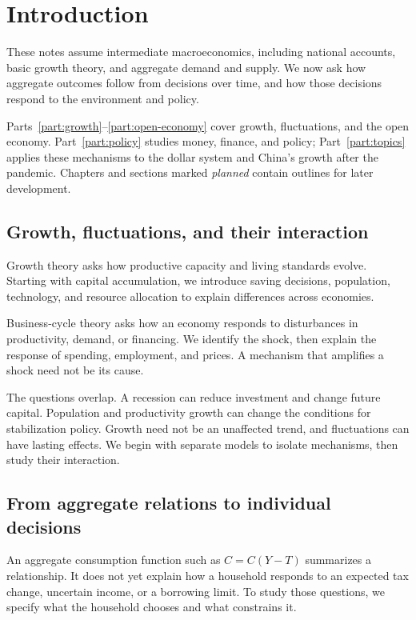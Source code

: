 \section{Introduction}\label{sec:introduction}

These notes assume intermediate macroeconomics, including national accounts,
basic growth theory, and aggregate demand and supply. We now ask how aggregate
outcomes follow from decisions over time, and how those decisions respond to
the environment and policy.

Parts~\ref{part:growth}--\ref{part:open-economy} cover growth, fluctuations,
and the open economy. Part~\ref{part:policy} studies money, finance, and policy;
Part~\ref{part:topics} applies these mechanisms to the dollar system and
China's growth after the pandemic. Chapters and sections marked
\textit{planned} contain outlines for later development.

\subsection{Growth, fluctuations, and their interaction}\label{sec:intro-growth}

Growth theory asks how productive capacity and living standards evolve. Starting with capital accumulation, we introduce saving decisions, population, technology, and resource allocation to explain differences across economies.

Business-cycle theory asks how an economy responds to disturbances in productivity, demand, or financing. We identify the shock, then explain the response of spending, employment, and prices. A mechanism that amplifies a shock need not be its cause.

The questions overlap. A recession can reduce investment and change future capital. Population and productivity growth can change the conditions for stabilization policy. Growth need not be an unaffected trend, and fluctuations can have lasting effects. We begin with separate models to isolate mechanisms,
then study their interaction.

\subsection{From aggregate relations to individual decisions}\label{sec:intro-choice}

An aggregate consumption function such as $C=C(Y-T)$ summarizes a relationship.
It does not yet explain how a household responds to an expected tax change,
uncertain income, or a borrowing limit. To study those questions, we specify
what the household chooses and what constrains it.

